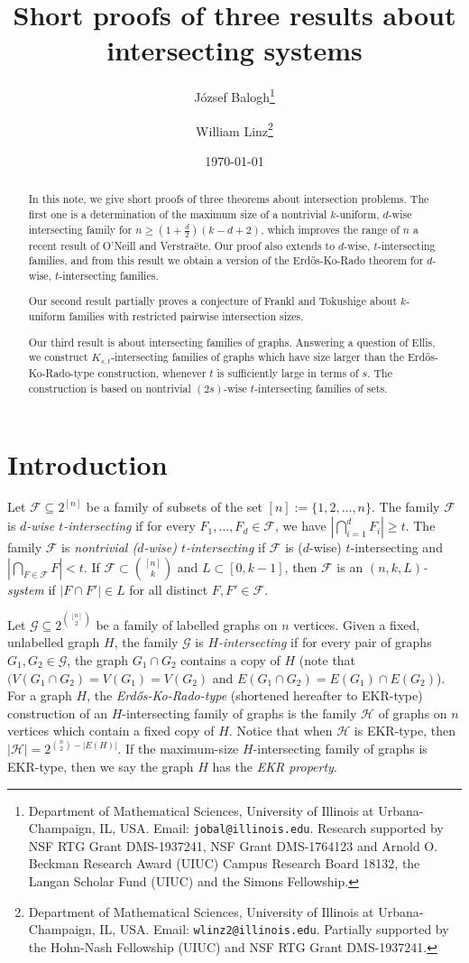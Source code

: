 \documentclass[12pt]{article}
\title{Short proofs of three results about intersecting systems}
\author{J\'ozsef Balogh\thanks{Department of Mathematical Sciences, University of Illinois at Urbana-Champaign, IL, USA. Email: \texttt{jobal@illinois.edu}. Research supported by NSF RTG Grant DMS-1937241, NSF Grant DMS-1764123 and Arnold O. Beckman Research Award (UIUC) Campus Research Board 18132, the Langan Scholar Fund (UIUC)  and the Simons Fellowship.}  
\and
William Linz\thanks{Department of Mathematical Sciences, University of Illinois at Urbana-Champaign, IL, USA. Email: \texttt{wlinz2@illinois.edu}. Partially supported by the Hohn-Nash Fellowship (UIUC) and NSF RTG Grant DMS-1937241.}}
\date{\today}
\theoremstyle{definition}
\newcommand{\cG}{\mathcal{G}}
\newcommand{\cH}{\mathcal{H}}
\newcommand{\cF}{\mathcal{F}}
\begin{document}
\maketitle

\begin{abstract}
In this note, we give short proofs of three theorems about intersection problems. The first one is a determination of the maximum size of a nontrivial $k$-uniform, $d$-wise intersecting family for $n\ge \left(1+\frac{d}{2}\right)(k-d+2)$, which improves the range of $n$ a recent result of O'Neill and Verstra\"{e}te. Our proof also extends to $d$-wise, $t$-intersecting families, and from this result we obtain a version of the Erd\H{o}s-Ko-Rado theorem for $d$-wise, $t$-intersecting families.

Our second result partially proves a conjecture of Frankl and Tokushige about $k$-uniform families with restricted pairwise intersection sizes. 

Our third result is about intersecting families of graphs. Answering a question of Ellis, we construct $K_{s, t}$-intersecting families of graphs which have size larger than the Erd\H{o}s-Ko-Rado-type construction, whenever $t$ is sufficiently large in terms of $s$. The construction is based on nontrivial $(2s)$-wise $t$-intersecting families of sets.

\end{abstract}

\section{Introduction}

Let $\cF \subseteq 2^{[n]}$ be a family of subsets of the set $[n]:= \{1, 2, \ldots, n\}$. The family $\cF$ is \textit{$d$-wise $t$-intersecting} if for every $F_1, \ldots, F_d \in \cF$, we have $|\bigcap_{i=1}^dF_i| \ge t$. The family $\cF$ is \textit{nontrivial ($d$-wise) $t$-intersecting} if $\cF$ is ($d$-wise) $t$-intersecting and  $|\bigcap_{F\in \cF} F| < t$. If $\cF \subset \binom{[n]}{k}$ and $L \subset [0, k-1]$, then $\cF$ is an \emph{$(n, k, L)$-system} if $|F\cap F'| \in L$ for all distinct $F, F'\in \cF$. 

Let $\cG \subseteq 2^{\binom{[n]}{2}}$ be a family of labelled graphs on $n$ vertices. Given a fixed, unlabelled graph $H$, the family $\cG$ is \emph{$H$-intersecting} if for every pair of graphs $G_1, G_2 \in \cG$, the graph $G_1\cap G_2$ contains a copy of $H$ (note that $(V(G_1\cap G_2) = V(G_1) = V(G_2)$ and $E(G_1\cap G_2) = E(G_1) \cap E(G_2)$). For a graph $H$, the \emph{Erd\H{o}s-Ko-Rado-type} (shortened hereafter to EKR-type) construction of an $H$-intersecting family of graphs is the family $\cH$ of graphs on $n$ vertices which contain a fixed copy of $H$. Notice that when $\cH$ is EKR-type, then $|\cH| = 2^{\binom{n}{2}-|E(H)|}$. If the maximum-size $H$-intersecting family of graphs is EKR-type, then we say the graph $H$ has the \emph{EKR property}. 
\end{document}
